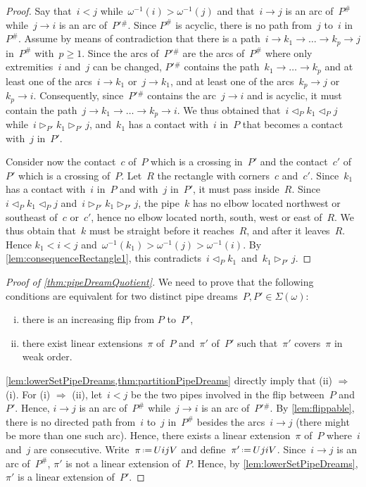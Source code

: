 \documentclass[reqno]{amsart}
\theoremstyle{definition}
\newcommand{\eqdef}{\mbox{\,\raisebox{0.2ex}{\scriptsize\ensuremath{\mathrm:}}\ensuremath{=}\,}} %
\newcommand{\contact}{^\#} %
\newcommand{\acyclicPipeDreams}{\Sigma} %
\newcommand{\less}{\vartriangleleft} %
\newcommand{\more}{\vartriangleright} %
\newcommand{\contactLess}[1]{\less_{#1}} %
\newcommand{\contactMore}[1]{\more_{#1}} %
\begin{document}
\begin{proof}
Say that~$i < j$ while~$\omega^{-1}(i) > \omega^{-1}(j)$ and that~$i \to j$ is an arc of~$P\contact$ while~$j \to i$ is an arc of~$P'{}\contact$.
Since $P\contact$ is acyclic, there is no path from~$j$ to~$i$ in~$P\contact$.
Assume by means of contradiction that there is a path~$i \to k_1 \to \dots \to k_p \to j$ in~$P\contact$ with~$p \ge 1$.
Since the arcs of~$P'{}\contact$ are the arcs of~$P\contact$ where only extremities~$i$ and~$j$ can be changed, $P'{}\contact$ contains the path~$k_1 \to \dots \to k_p$ and at least one of the arcs~$i \to k_1$ or~$j \to k_1$, and at least one of the arcs~$k_p \to j$ or~$k_p \to i$.
Consequently, since~$P'{}\contact$ contains the arc~$j \to i$ and is acyclic, it must contain the path~$j \to k_1 \to \dots \to k_p \to i$.
We thus obtained that~$i \contactLess{P} k_1 \contactLess{P} j$ while~$i \contactMore{P'} k_1 \contactMore{P'} j$, and~$k_1$ has a contact with~$i$ in~$P$ that becomes a contact with~$j$ in~$P'$.

Consider now the contact~$c$ of~$P$ which is a crossing in~$P'$ and the contact~$c'$ of~$P'$ which is a crossing of~$P$.
Let~$R$ the rectangle with corners~$c$ and~$c'$.
Since~$k_1$ has a contact with~$i$ in~$P$ and with~$j$ in~$P'$, it must pass inside~$R$.
Since~$i \contactLess{P} k_1 \contactLess{P} j$ and~$i \contactMore{P'} k_1 \contactMore{P'} j$, the pipe~$k$ has no elbow located northwest or southeast of~$c$ or~$c'$, hence no elbow located north, south, west or east of~$R$.
We thus obtain that~$k$ must be straight before it reaches~$R$, and after it leaves~$R$.
Hence $k_1 < i < j$ and~$\omega^{-1}(k_1) > \omega^{-1}(j) > \omega^{-1}(i)$.
By \cref{lem:consequenceRectangle1}, this contradicts~$i \contactLess{P} k_1$~and~$k_1 \contactMore{P'} j$.
\end{proof}

\begin{proof}[Proof of \cref{thm:pipeDreamQuotient}]
We need to prove that the following conditions are equivalent for two distinct pipe dreams~$P,P' \in \acyclicPipeDreams(\omega)$:
\begin{enumerate}[(i)]
\item there is an increasing flip from $P$ to~$P'$,
\item there exist linear extensions~$\pi$ of~$P$ and~$\pi'$ of~$P'$ such that~$\pi'$ covers~$\pi$ in weak order.
\end{enumerate}
\cref{lem:lowerSetPipeDreams,thm:partitionPipeDreams} directly imply that (ii) $\Rightarrow$ (i).
For (i) $\Rightarrow$ (ii), let~$i < j$ be the two pipes involved in the flip between~$P$ and~$P'$.
Hence, $i \to j$ is an arc of~$P\contact$ while~$j \to i$ is an arc of~$P'{}\contact$.
By \cref{lem:flippable}, there is no directed path from~$i$ to~$j$ in~$P\contact$ besides the arcs~$i \to j$ (there might be more than one such arc).
Hence, there exists a linear extension~$\pi$ of~$P$ where~$i$ and~$j$ are consecutive.
Write~$\pi \eqdef UijV$ and define~$\pi' \eqdef UjiV$.
Since~$i \to j$ is an arc of~$P\contact$, $\pi'$ is not a linear extension of~$P$.
Hence, by \cref{lem:lowerSetPipeDreams}, $\pi'$ is a linear extension of~$P'$.
\end{proof}
\end{document}
